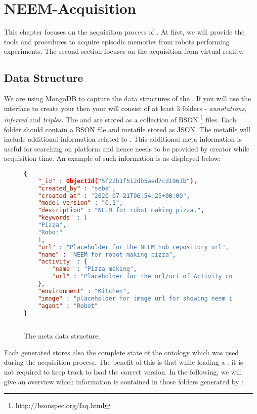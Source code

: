 \chapter{NEEM-Acquisition}
\label{ch:acquisition}

This chapter focuses on the acquisition process of \neems.
At first, we will provide the tools and procedures to acquire episodic memories from robots performing experiments.
The second section focuses on the \neem acquisition from virtual reality. 




\section{Data Structure}

We are using MongoDB to capture the data structures of the \neems.
If you will use the \knowrob interface to create your \neems then your \neem will consist of at least 3 folders - \textit{annotations}, \textit{inferred} and \textit{triples}.
The \neemnar and \neemexp are stored as a collection of BSON \footnote{http://bsonspec.org/faq.html} files.
Each folder should contain a BSON file and metafile stored as JSON. The metafile will include additional information related to \neems. This additional meta information is useful for searching \neem on \openease platform and hence needs to be provided by \neem creator while \neem acquisition time. An example of such information is as displayed below:

\def\arraystretch{1.1}%
\begin{figure}[htb]
\begin{lstlisting}[language=json,firstnumber=1]
{
	"_id" : ObjectId("5f22b1f512db5aed7cd1961b"), 
	"created_by" : "seba",
	"created_at" : "2020-07-21T06:54:25+00:00",
	"model_version" : "0.1",
	"description" : "NEEM for robot making pizza.",
	"keywords" : [	
	"Pizza",
	"Robot"
	],
	"url" : "Placeholder for the NEEM hub repository url",
	"name" : "NEEM for robot making pizza",
	"activity" : {
		"name" : "Pizza making",
		"url" : "Placeholder for the url/uri of Activity concept defined in ontology"    
	},
	"environment" : "Kitchen",
	"image" : "placeholder for image url for showing neem image on openEASE",  
	"agent" : "Robot"
}
	
\end{lstlisting}
\caption{The meta data structure.}
\label{fig:meta_data}
\end{figure}
Each generated \neem stores also the complete state of the \soma ontology which was used during the acquisition process.
The benefit of this is that while loading a \neem, it is not required to keep track to load the correct \soma version.
In the following, we will give an overview which information is contained in those folders generated by \knowrob:


